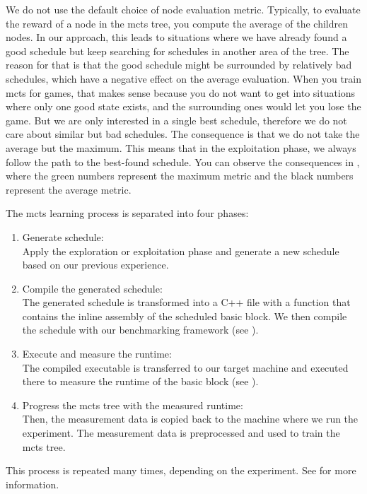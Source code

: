 We do not use the default choice of node evaluation metric.
Typically, to evaluate the reward of a node in the \ac{mcts} tree, you compute the average of the children nodes.
In our approach, this leads to situations where we have already found a good schedule but keep searching for schedules in another area of the tree.
The reason for that is that the good schedule might be surrounded by relatively bad schedules, which have a negative effect on the average evaluation.
When you train \ac{mcts} for games, that makes sense because you do not want to get into situations where only one good state exists, and the surrounding ones would let you lose the game.
But we are only interested in a single best schedule, therefore we do not care about similar but bad schedules.
The consequence is that we do not take the average but the maximum.
This means that in the exploitation phase, we always follow the path to the best-found schedule.
You can observe the consequences in , where the green numbers represent the maximum metric and the black numbers represent the average metric.

The \ac{mcts} learning process is separated into four phases:
\begin{enumerate}
    \item Generate schedule: \\
    Apply the exploration or exploitation phase and generate a new schedule based on our previous experience.
    \item Compile the generated schedule: \\
    The generated schedule is transformed into a C++ file with a function that contains the inline assembly of the scheduled basic block.
    We then compile the schedule with our benchmarking framework (see ).
    \item Execute and measure the runtime: \\
    The compiled executable is transferred to our target machine and executed there to measure the runtime of the basic block (see ).
    \item Progress the \ac{mcts} tree with the measured runtime: \\
    Then, the measurement data is copied back to the machine where we run the experiment.
    The measurement data is preprocessed and used to train the \ac{mcts} tree.
\end{enumerate}
This process is repeated many times, depending on the experiment.
See  for more information.

